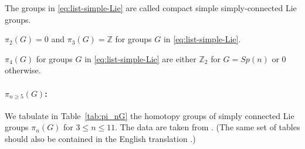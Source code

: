 \documentclass[12pt]{article}
\numberwithin{equation}{section}
\theoremstyle{remark}
\def\bZ{\mathbb{Z}}
\begin{document}
The groups in \eqref{eq:list-simple-Lie} are called compact 
simple simply-connected Lie groups.

\begin{fact}
$\pi_2(G)=0$ and $\pi_3(G)=\bZ$ for groups $G$ in \eqref{eq:list-simple-Lie}.
\end{fact}

\begin{fact}
$\pi_4(G)$ for groups $G$ in \eqref{eq:list-simple-Lie} are 
either $\bZ_2$ for $G=Sp(n)$ or $0$ otherwise.
\end{fact}

\paragraph{$\pi_{n\ge 5}(G)$:}

We tabulate in Table~\ref{tab:pi_nG}
the homotopy groups of simply connected Lie groups $\pi_{n}(G)$ 
for  $3\le n\le 11$.
The data are taken from \cite[付録, 公式 7, VII]{Jiten}.
(The same set of tables should also be contained in the English translation \cite{EDM}.)
\end{document}
